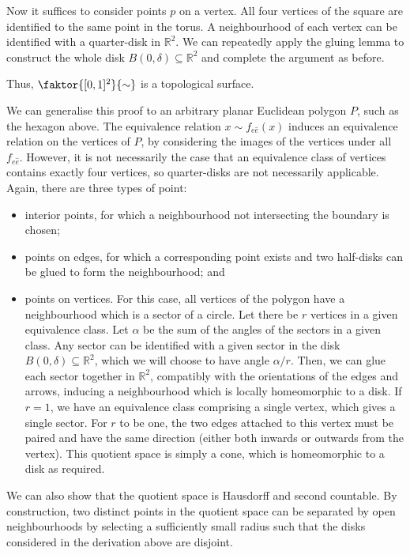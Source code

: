 \begin{example}
\begin{example}
		Now it suffices to consider points \( p \) on a vertex.
		All four vertices of the square are identified to the same point in the torus.
		A neighbourhood of each vertex can be identified with a quarter-disk in \( \mathbb R^2 \).
		We can repeatedly apply the gluing lemma to construct the whole disk \( B(0,\delta) \subseteq \mathbb R^2 \) and complete the argument as before.

		Thus, \( \faktor{[0,1]^2}{\sim} \) is a topological surface.
	\end{example}
	We can generalise this proof to an arbitrary planar Euclidean polygon \( P \), such as the hexagon above.
	The equivalence relation \( x \sim f_{e \hat e}(x) \) induces an equivalence relation on the vertices of \( P \), by considering the images of the vertices under all \( f_{e\hat e} \).
	However, it is not necessarily the case that an equivalence class of vertices contains exactly four vertices, so quarter-disks are not necessarily applicable.
	Again, there are three types of point:
	\begin{itemize}
		\item interior points, for which a neighbourhood not intersecting the boundary is chosen;
		\item points on edges, for which a corresponding point exists and two half-disks can be glued to form the neighbourhood; and
		\item points on vertices.
		      For this case, all vertices of the polygon have a neighbourhood which is a sector of a circle.
		      Let there be \( r \) vertices in a given equivalence class.
		      Let \( \alpha \) be the sum of the angles of the sectors in a given class.
		      Any sector can be identified with a given sector in the disk \( B(0,\delta) \subseteq \mathbb R^2 \), which we will choose to have angle \( \alpha / r \).
		      Then, we can glue each sector together in \( \mathbb R^2 \), compatibly with the orientations of the edges and arrows, inducing a neighbourhood which is locally homeomorphic to a disk.
		      If \( r = 1 \), we have an equivalence class comprising a single vertex, which gives a single sector.
		      For \( r \) to be one, the two edges attached to this vertex must be paired and have the same direction (either both inwards or outwards from the vertex).
		      This quotient space is simply a cone, which is homeomorphic to a disk as required.
	\end{itemize}
	We can also show that the quotient space is Hausdorff and second countable.
	By construction, two distinct points in the quotient space can be separated by open neighbourhoods by selecting a sufficiently small radius such that the disks considered in the derivation above are disjoint.

\end{example}
